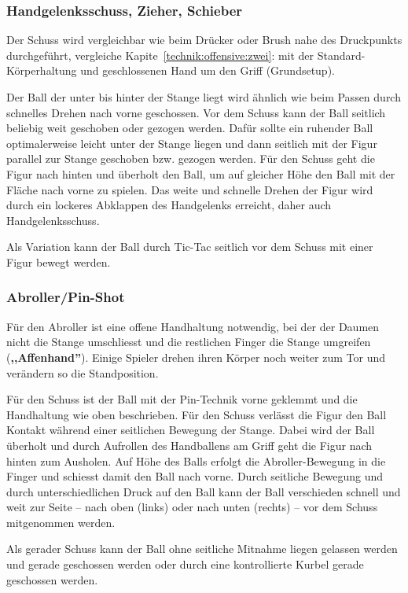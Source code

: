 \subsubsection{Handgelenksschuss, Zieher, Schieber}
\label{technik:offensive:schiessen:pull}
Der Schuss wird vergleichbar wie beim Drücker oder Brush nahe des Druckpunkts durchgeführt, vergleiche Kapite~\ref{technik:offensive:zwei}: mit der Standard-Körperhaltung und geschlossenen Hand um den Griff (Grundsetup).

Der Ball der unter bis hinter der Stange liegt wird ähnlich wie beim Passen durch schnelles Drehen nach vorne geschossen.
Vor dem Schuss kann der Ball seitlich beliebig weit geschoben oder gezogen werden.
Dafür sollte ein ruhender Ball optimalerweise leicht unter der Stange liegen und dann seitlich mit der Figur parallel zur Stange geschoben bzw. gezogen werden.
Für den Schuss geht die Figur nach hinten und überholt den Ball, um auf gleicher Höhe den Ball mit der Fläche nach vorne zu spielen.
Das weite und schnelle Drehen der Figur wird durch ein lockeres Abklappen des Handgelenks erreicht, daher auch Handgelenksschuss.

Als Variation kann der Ball durch Tic-Tac seitlich vor dem Schuss mit einer Figur bewegt werden.

\subsubsection{Abroller/Pin-Shot}
\label{technik:offensive:schiessen:pin}
Für den Abroller ist eine offene Handhaltung notwendig, bei der der Daumen nicht die Stange umschliesst und die restlichen Finger die Stange umgreifen (\textbf{,,Affenhand''}).
Einige Spieler drehen ihren Körper noch weiter zum Tor und verändern so die Standposition.

Für den Schuss ist der Ball mit der Pin-Technik vorne geklemmt und die Handhaltung wie oben beschrieben. 
Für den Schuss verlässt die Figur den Ball Kontakt während einer seitlichen Bewegung der Stange.
Dabei wird der Ball überholt und durch Aufrollen des Handballens am Griff geht die Figur nach hinten zum Ausholen. 
Auf Höhe des Balls erfolgt die Abroller-Bewegung in die Finger und schiesst damit den Ball nach vorne.
Durch seitliche Bewegung und durch unterschiedlichen Druck auf den Ball kann der Ball verschieden schnell und weit zur Seite -- nach oben (links) oder nach unten (rechts) -- vor dem Schuss mitgenommen werden.

Als gerader Schuss kann der Ball ohne seitliche Mitnahme liegen gelassen werden und gerade geschossen werden oder durch eine kontrollierte Kurbel gerade geschossen werden. 

